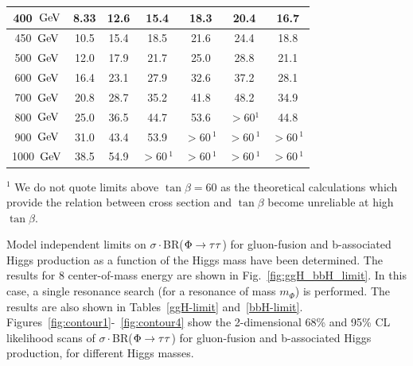 \begin{table}[!h]
\begin{center}
\begin{tabular}{|c|c|c|c|c|c|c|}
\hline
               400~$\mathrm{GeV}$ &            8.33 &           12.6 &           15.4 &           18.3 &           20.4 &           16.7  \\
\hline
               450~$\mathrm{GeV}$ &           10.5 &           15.4 &           18.5 &           21.6 &           24.4 &           18.8  \\
\hline
               500~$\mathrm{GeV}$ &           12.0 &           17.9 &           21.7 &           25.0 &           28.8 &           21.1  \\
\hline
               600~$\mathrm{GeV}$ &           16.4 &           23.1 &           27.9 &           32.6 &           37.2 &           28.1  \\
\hline
               700~$\mathrm{GeV}$ &           20.8 &           28.7 &           35.2 &           41.8 &           48.2 &           34.9  \\
\hline
               800~$\mathrm{GeV}$ &           25.0 &           36.5 &           44.7 &           53.6 &           $> 60$$^{1}$ &           44.8  \\
\hline
               900~$\mathrm{GeV}$ &           31.0 &           43.4 &           53.9 &           $> 60$\,$^{1}$ &          $> 60$\,$^{1}$ &           $> 60$\,$^{1}$  \\
\hline
              1000~$\mathrm{GeV}$ &           38.5 &           54.9 &          $> 60$\,$^{1}$ &           $> 60$\,$^{1}$ &          $> 60$\,$^{1}$ &           $> 60$\,$^{1}$  \\
\hline
 \end{tabular}
    \label{tab-limits}
  \end{center}
$^{1}$ We do not quote limits above $\tan\beta = 60$ as the theoretical calculations
which provide the relation between cross section and $\tan\beta$ 
become unreliable at high $\tan\beta$. 
\end{table}

\clearpage

Model independent limits on $\sigma\cdot$BR($\Phi\to\mathrm{\tau}\mathrm{\tau}$) for gluon-fusion and b-associated Higgs production as a function of the Higgs mass
have been determined.
The results for 8 \TeV center-of-mass energy are shown in Fig.~\ref{fig:ggH_bbH_limit}.
In this case, a single resonance search (for a resonance of mass $m_{\Phi}$) is performed.  The results are also shown in Tables~\ref{ggH-limit} and~\ref{bbH-limit}.
Figures~\ref{fig:contour1}-~\ref{fig:contour4} show the 2-dimensional 68\% and 95\% CL likelihood scans of $\sigma\cdot$BR($\Phi\to\mathrm{\tau}\mathrm{\tau}$) for gluon-fusion and b-associated Higgs production, for different Higgs masses.



